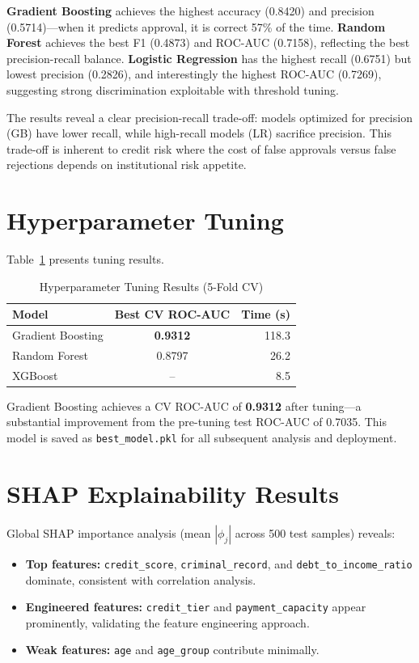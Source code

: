 \documentclass[12pt]{report}
\begin{document}
\textbf{Gradient Boosting} achieves the highest accuracy (0.8420) and precision (0.5714)---when it predicts approval, it is correct 57\% of the time. \textbf{Random Forest} achieves the best F1 (0.4873) and ROC-AUC (0.7158), reflecting the best precision-recall balance. \textbf{Logistic Regression} has the highest recall (0.6751) but lowest precision (0.2826), and interestingly the highest ROC-AUC (0.7269), suggesting strong discrimination exploitable with threshold tuning.

The results reveal a clear precision-recall trade-off: models optimized for precision (GB) have lower recall, while high-recall models (LR) sacrifice precision. This trade-off is inherent to credit risk where the cost of false approvals versus false rejections depends on institutional risk appetite.


\section{Hyperparameter Tuning}

Table~\ref{tab:tuning_results} presents tuning results.

\begin{table}[H]
\centering
\caption{Hyperparameter Tuning Results (5-Fold CV)}
\label{tab:tuning_results}
\begin{tabular}{lcr}
\toprule
\textbf{Model} & \textbf{Best CV ROC-AUC} & \textbf{Time (s)} \\
\midrule
Gradient Boosting & \textbf{0.9312} & 118.3 \\
Random Forest & 0.8797 & 26.2 \\
XGBoost & -- & 8.5 \\
\bottomrule
\end{tabular}
\end{table}

Gradient Boosting achieves a CV ROC-AUC of \textbf{0.9312} after tuning---a substantial improvement from the pre-tuning test ROC-AUC of 0.7035. This model is saved as \texttt{best\_model.pkl} for all subsequent analysis and deployment.


\section{SHAP Explainability Results}

Global SHAP importance analysis (mean $|\phi_j|$ across 500 test samples) reveals:

\begin{itemize}[nosep]
    \item \textbf{Top features:} \texttt{credit\_score}, \texttt{criminal\_record}, and \texttt{debt\_to\_income\_ratio} dominate, consistent with correlation analysis.
    \item \textbf{Engineered features:} \texttt{credit\_tier} and \texttt{payment\_capacity} appear prominently, validating the feature engineering approach.
    \item \textbf{Weak features:} \texttt{age} and \texttt{age\_group} contribute minimally.
\end{itemize}
\end{document}
